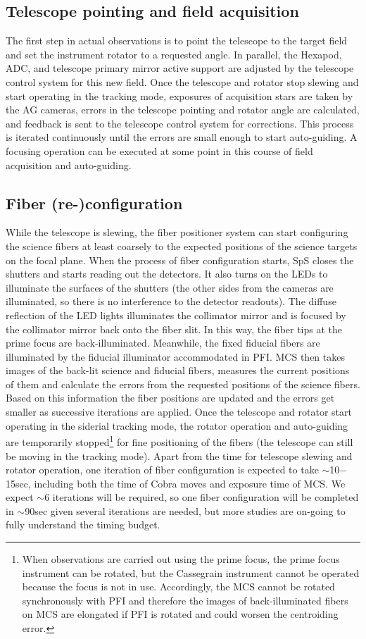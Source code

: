 \documentclass[a4paper]{article}
\begin{document}
\subsection{Telescope pointing and field acquisition}
The first step in actual observations is to point the telescope to the
target field and set the instrument rotator to a requested angle.  In
parallel, the Hexapod, ADC, and telescope primary mirror active
support are adjusted by the telescope control system for this new
field. Once the telescope and rotator stop slewing and start operating
in the tracking mode, exposures of acquisition stars are taken by the
AG cameras, errors in the telescope pointing and rotator angle are
calculated, and feedback is sent to the telescope control system for
corrections.  This process is iterated continuously until the errors
are small enough to start auto-guiding. A focusing operation can be
executed at some point in this course of field acquisition and
auto-guiding.

\subsection{Fiber (re-)configuration}
While the telescope is slewing, the fiber positioner system can start
configuring the science fibers at least coarsely to the expected
positions of the science targets on the focal plane. When the process
of fiber configuration starts, SpS closes the shutters and starts
reading out the detectors. It also turns on the LEDs to illuminate the
surfaces of the shutters (the other sides from the cameras are
illuminated, so there is no interference to the detector
readouts). The diffuse reflection of the LED lights illuminates the
collimator mirror and is focused by the collimator mirror back onto
the fiber slit. In this way, the fiber tips at the prime focus are
back-illuminated. Meanwhile, the fixed fiducial fibers are illuminated
by the fiducial illuminator accommodated in PFI. MCS then takes images
of the back-lit science and fiducial fibers, measures the current
positions of them and calculate the errors from the requested
positions of the science fibers. Based on this information the fiber
positions are updated and the errors get smaller as successive
iterations are applied. Once the telescope and rotator start operating
in the siderial tracking mode, the rotator operation and auto-guiding
are temporarily stopped\footnote{When observations are carried out
  using the prime focus, the prime focus instrument can be rotated,
  but the Cassegrain instrument cannot be operated because the focus
  is not in use. Accordingly, the MCS cannot be rotated synchronously
  with PFI and therefore the images of back-illuminated fibers on MCS
  are elongated if PFI is rotated and could worsen the centroiding
  error.}  for fine positioning of the fibers (the telescope can still
be moving in the tracking mode).
%
Apart from the time for telescope slewing and rotator operation, one
iteration of fiber configuration is expected to take $\sim$10$-$15sec,
including both the time of Cobra moves and exposure time of MCS. We
expect $\sim$6 iterations will be required, so one fiber
configuration will be completed in $\sim$90sec given several
iterations are needed, but more studies are on-going to fully
understand the timing budget.
\end{document}
